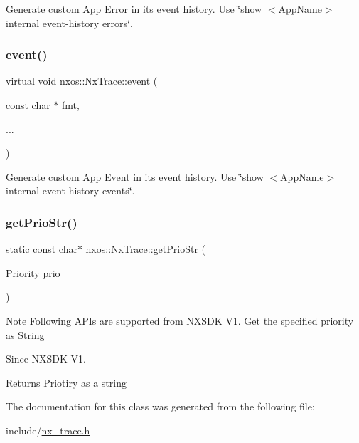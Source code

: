 Generate custom App Error in its event history. Use \char`\"{}show $<$\+App\+Name$>$ internal event-\/history errors\char`\"{}. \mbox{\label{classnxos_1_1_nx_trace_a22e5e2fff39fae68fba3051dc2720621}} 
\subsubsection{\texorpdfstring{event()}{event()}}
{\footnotesize\ttfamily virtual void nxos\+::\+Nx\+Trace\+::event (\begin{DoxyParamCaption}\item[{const char $\ast$}]{fmt,  }\item[{}]{... }\end{DoxyParamCaption})\hspace{0.3cm}{\ttfamily [pure virtual]}}

Generate custom App Event in its event history. Use \char`\"{}show $<$\+App\+Name$>$ internal event-\/history events\char`\"{}. \mbox{\label{classnxos_1_1_nx_trace_a583b8a49a2111e4e4b8ef2f2eeaa4620}} 
\subsubsection{\texorpdfstring{get\+Prio\+Str()}{getPrioStr()}}
{\footnotesize\ttfamily static const char$\ast$ nxos\+::\+Nx\+Trace\+::get\+Prio\+Str (\begin{DoxyParamCaption}\item[{\mbox{\hyperlink{classnxos_1_1_nx_trace_a582f6e5a22e788c61807657f8bca088f}{Priority}}}]{prio }\end{DoxyParamCaption})\hspace{0.3cm}{\ttfamily [static]}}

\begin{DoxyNote}{Note}
Following A\+P\+Is are supported from N\+X\+S\+DK V1. Get the specified priority as String
\end{DoxyNote}
\begin{DoxySince}{Since}
N\+X\+S\+DK V1.
\end{DoxySince}
\begin{DoxyReturn}{Returns}
Priotiry as a string 
\end{DoxyReturn}


The documentation for this class was generated from the following file\+:\begin{DoxyCompactItemize}
\item 
include/\mbox{\hyperlink{nx__trace_8h}{nx\+\_\+trace.\+h}}\end{DoxyCompactItemize}
